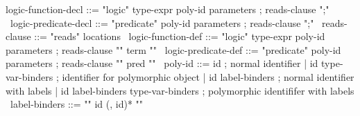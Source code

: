 \begin{syntax}
  logic-function-decl ::= "logic" type-expr poly-id parameters ;
                          reads-clause ";"
  \
  logic-predicate-decl ::= "predicate" poly-id parameters ;
                          reads-clause ";"
  \
  reads-clause ::= "reads" locations
  \
  logic-function-def ::= "logic" type-expr poly-id parameters ;
                   reads-clause "{" term "}"
  \
  logic-predicate-def ::= "predicate" poly-id parameters ; 
                          reads-clause "{" pred "}"
  \
  poly-id ::= id ; normal identifier
  | id type-var-binders ; identifier for polymorphic object 
  | id label-binders ; normal identifier with labels
  | id label-binders type-var-binders ; polymorphic identififer with labels
  \ 
  label-binders ::= "{" id (, id)* "}" 
\end{syntax}